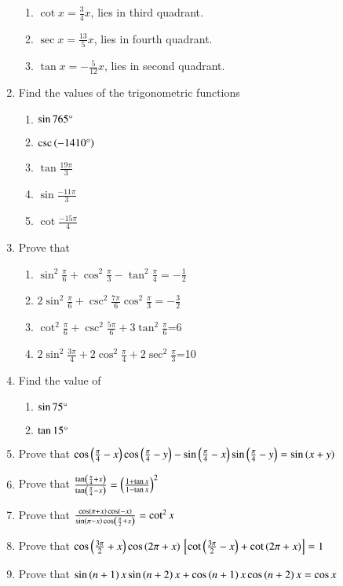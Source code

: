 \begin{enumerate}[label=\thesubsection.\arabic*.,ref=\thesubsection.\theenumi,itemsep=1ex]
\begin{enumerate}
	\item $\cot x= \frac{3}{4}x$,  lies in third quadrant.
	\item $\sec x= \frac{13}{5}x$,  lies in fourth quadrant.
	\item $\tan x=-\frac{5}{12}x$,  lies in second quadrant.
\end{enumerate}
%
\item Find the values of the trigonometric functions
\begin{enumerate}
\item $\sin765\degree$
\item $\csc\left(-1410\degree\right)$
\item $\tan\frac{19\pi}{3}$
\item $\sin\frac{-11\pi}{3}$
\item $\cot\frac{-15\pi}{4}$
\end{enumerate}
%
\item Prove that
\begin{enumerate}
\item $\sin^{2}\frac{\pi}{6}+\cos^{2}\frac{\pi}{3}-\tan^{2}\frac{\pi}{4}=-\frac{1}{2}$
\item $2\sin^{2}\frac{\pi}{6}+\csc^{2}\frac{7\pi}{6}\cos^{2}\frac{\pi}{3}=-\frac{3}{2}$
\item $\cot^{2}\frac{\pi}{6}+\csc^{2}\frac{5\pi}{6}+3\tan^{2}\frac{\pi}{6}$=6
\item $2\sin^{2}\frac{3\pi}{4}+2\cos^{2}\frac{\pi}{4}+2\sec^{2}\frac{\pi}{3}$=10
\end{enumerate}
%
\item Find the value of
\begin{enumerate}
\item$\sin75\degree$
\item $\tan15\degree$
\end{enumerate}
%
\item Prove that 
 $\cos\left(\frac{\pi}{4}-x\right)\cos\left(\frac{\pi}{4}-y\right)-\sin\left(\frac{\pi}{4}-x\right)\sin\left(\frac{\pi}{4}-y\right)=\sin\left(x+y\right)$
%
\item Prove that 
$\frac{\tan\left(\frac{\pi}{4}+x\right)}{\tan\left(\frac{\pi}{4}-x\right)}=\left(\frac{1+\tan x}{1-\tan x}\right)^{2}$
%
\item Prove that
$\frac{\cos\left(\pi+x\right)\cos\left(-x\right)}{\sin\left(\pi-x\right)\cos\left(\frac{\pi}{2}+x\right)}=\cot^{2}x$
%
\item Prove that
$\cos\left(\frac{3\pi}{2}+x\right)\cos\left(2\pi+x\right){}\left[\cot\left(\frac{3\pi}{2}-x\right)+\cot\left(2\pi +x\right)\right]=1$
%
\item Prove that
$\sin\left(n+1\right)x\sin\left(n+2\right)x+\cos\left(n+1\right)x\cos\left(n+2\right)x=\cos x$

\end{enumerate}
